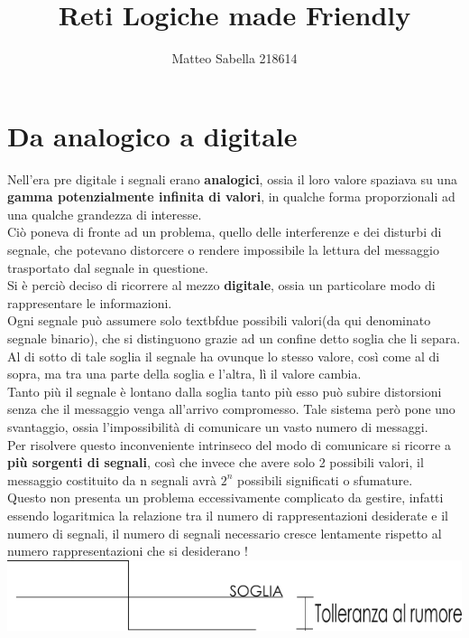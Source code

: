 \documentclass[a4paper]{book}
\title{Reti Logiche made Friendly}
\author{Matteo Sabella 218614}
\begin{document}
\maketitle


\chapter{Da analogico a digitale}
Nell'era pre digitale i segnali erano \textbf{analogici}, ossia il loro valore spaziava su una \textbf{gamma potenzialmente infinita di valori}, in qualche forma proporzionali ad una qualche grandezza di interesse.\\
Ciò poneva di fronte ad un problema, quello delle interferenze e dei disturbi di segnale, che potevano distorcere o rendere impossibile la lettura del messaggio trasportato dal segnale in questione.\\
Si è perciò deciso di ricorrere al mezzo \textbf{digitale}, ossia un particolare modo di rappresentare le informazioni.\\
Ogni segnale può assumere solo textbf{due possibili valori}(da qui denominato segnale binario), che si distinguono grazie ad un confine detto soglia che li separa.\\
Al di sotto di tale soglia il segnale ha ovunque lo stesso valore, così come al di sopra, ma tra una parte della soglia e l'altra, lì il valore cambia.\\
Tanto più il segnale è lontano dalla soglia tanto più esso può subire distorsioni senza che il messaggio venga all'arrivo compromesso.
Tale sistema però pone uno svantaggio, ossia l'impossibilità di comunicare un vasto numero di messaggi.\\
Per risolvere questo inconveniente intrinseco del modo di comunicare si ricorre a \textbf{più sorgenti di segnali}, così che invece che avere solo 2 possibili valori, il messaggio costituito da n segnali avrà \(2^n\) possibili significati o sfumature.\\
Questo non presenta un problema eccessivamente complicato da gestire, infatti essendo logaritmica la relazione tra il numero di rappresentazioni desiderate e il numero di segnali, il numero di segnali necessario cresce lentamente rispetto al numero rappresentazioni che si desiderano ! \\

\includegraphics[width=\textwidth]{SchemaDigitale}
\end{document}
